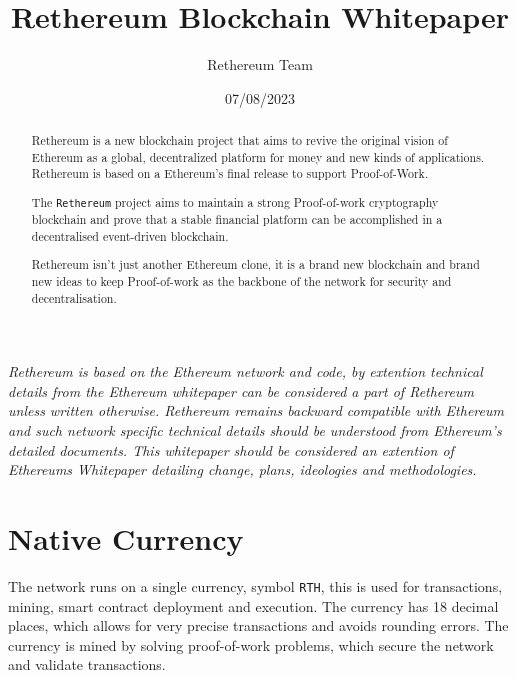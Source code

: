 \documentclass[a4paper,onecolumn, superscriptaddress,10pt,accepted=2020-05-01,issue=1, volume=2, shorttitle=papers]{compositionalityarticle}
\begin{document}
\title{Rethereum Blockchain Whitepaper}
\date{07/08/2023}
\author{Rethereum Team}

\maketitle

\begin{abstract}
     
     Rethereum is a new blockchain project that aims to revive the original vision of Ethereum as a global, decentralized platform for money and new kinds of applications. Rethereum is based on a Ethereum's final release to support Proof-of-Work.
     
     The \texttt{Rethereum} project aims to maintain a strong Proof-of-work cryptography blockchain and prove that a stable financial platform can be accomplished in a decentralised event-driven blockchain.
    
    Rethereum isn't just another Ethereum clone, it is a brand new blockchain and brand new ideas to keep Proof-of-work as the backbone of the network for security and decentralisation. 
    
\end{abstract}

\vspace{10cm}

\footnotesize{\textit{Rethereum is based on the Ethereum network and code, by extention 
technical details from the Ethereum whitepaper can be considered a part 
of Rethereum unless written otherwise. Rethereum remains backward compatible 
with Ethereum and such network specific technical details should be 
understood from Ethereum's detailed documents. This whitepaper should be 
considered an extention of Ethereums Whitepaper detailing change, plans, 
ideologies and methodologies.}}


\newpage


\section{Native Currency}

The network runs on a single currency, symbol \texttt{RTH}, this is used for transactions, mining, smart contract deployment and execution. The currency has 18 decimal places, which allows for very precise transactions and avoids rounding errors. The currency is mined by solving proof-of-work problems, which secure the network and validate transactions. 
\end{document}
